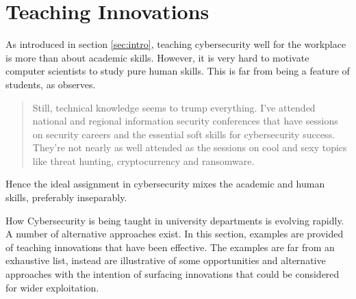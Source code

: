 \documentclass[conference]{IEEEtran}
\begin{document}



\section{Teaching Innovations}\label{sec:authors}
As introduced in section \ref{sec:intro}, teaching cybersecurity well for the workplace is more than about academic skills. However, it is very hard to motivate computer scientists to study pure human skills. This is far from being a feature of students, as \cite{Beaver2019c} observes.
\begin{quote}
Still, technical knowledge seems to trump everything. I've attended national and regional information security conferences that have sessions on security careers and the essential soft skills for cybersecurity success. They're not nearly as well attended as the sessions on cool and sexy topics like threat hunting, cryptocurrency and ransomware.
\end{quote}
Hence the ideal assignment in cybersecurity mixes the academic and human skills, preferably inseparably.

How Cybersecurity is being taught in university departments is evolving rapidly. A number of alternative approaches exist. In this section, examples are provided of teaching innovations that have been effective. The examples are far from an exhaustive list, instead are illustrative of some opportunities and alternative approaches with the intention of surfacing innovations that could be considered for wider exploitation.
\end{document}
